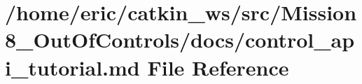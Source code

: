 \hypertarget{Mission8__OutOfControls_2docs_2control__api__tutorial_8md}{}\section{/home/eric/catkin\+\_\+ws/src/\+Mission8\+\_\+\+Out\+Of\+Controls/docs/control\+\_\+api\+\_\+tutorial.md File Reference}
\label{Mission8__OutOfControls_2docs_2control__api__tutorial_8md}
